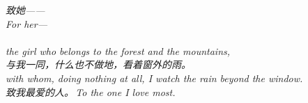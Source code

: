 
\begin{abstract}

\end{abstract}
\clearpage

\thispagestyle{empty}
\null\vfill
\begin{center}
\begin{minipage}{0.74\linewidth}
\centering\itshape\color{rose}
{\cjk 致她——}\\[0.3em]
For her---\\[0.7em]
\\[0.2em]
the girl who belongs to the forest and the mountains,\\[0.5em]
{\cjk 与我一同，什么也不做地，看着窗外的雨。}\\[0.2em]
with whom, doing nothing at all, I watch the rain beyond the window.\\[1.0em]
{\upshape\footnotesize\color{gold} {\cjk 致我最爱的人。}\,\;To the one I love most.}
\end{minipage}
\end{center}
\vfill\null
\clearpage


